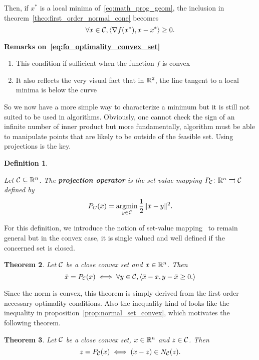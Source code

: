\documentclass[10pt]{article}
\newtheorem{theorem}{Theorem}[]
\newtheorem{definition}[theorem]{Definition}
\numberwithin{equation}{section}
\newcommand{\scal}[2]{\left\langle {#1} , {#2} \right\rangle} %
\begin{document}
	Then, if $x^*$ is a local minima of~\eqref{eq:math_prog_geom}, the inclusion in theorem~\ref{theo:first_order_normal_cone}  becomes
	\begin{equation}\label{eq:fo_optimality_convex_set}
		\forall x \in \calC, \scal{\nabla f(x^*)}{x-x^*} \ge 0.
	\end{equation}
	
	\textbf{Remarks on~\eqref{eq:fo_optimality_convex_set}}
	\begin{enumerate}
		\item This condition if sufficient when the function $f$ is convex
		\item It also reflects the very visual fact that in ${\mathbb{R}}^2$, the line tangent to a local minima is below the curve
	\end{enumerate}
	
	So we now have a more simple way to characterize a minimum but it is still not suited to be used in algorithms. Obviously, one cannot check the sign of an infinite number of inner product but more fundamentally, algorithm must be able to manipulate points that are likely to be outside of the feasible set. Using projections is the key.
	
	\begin{definition}\label{def:projection}
		
		Let ${\mathcal{C}} \subseteq {\mathbb{R}}^n$. The \textbf{projection operator} is the set-value mapping $P_{\mathcal{C}} \colon {\mathbb{R}}^n \rightrightarrows {\mathcal{C}} $ defined by
		\[ P_C(\bar{x}) = \operatorname*{argmin}_{y \in {\mathcal{C}}}  \dfrac{1}{2} \|\bar{x}-y\|^2.\]
	\end{definition}
	
	For this definition, we introduce the notion of set-value mapping~\cite{rockafellarwets:1998} to remain general but in the convex case, it is single valued and well defined if the concerned set is closed. 
	
	\begin{theorem}
		Let ${\mathcal{C}}$ be a close convex set and $x \in {\mathbb{R}}^n$. Then
		\[\bar{x} = P_\calC(x) \iff \forall y \in \calC, \scal{\bar{x}-x}{y-\bar{x} \ge 0.}\]
	\end{theorem}
	
	Since the norm is convex, this theorem is simply derived from the first order necessary optimality  conditions. Also the inequality kind of looks like the inequality in proposition~\eqref{prop:normal_set_convex}, which motivates the following theorem.
	
	\begin{theorem}
		Let ${\mathcal{C}}$ be a close convex set, $x \in {\mathbb{R}}^n$ and $z \in {\mathcal{C}}$. Then
		\[z = P_{\mathcal{C}}(x) \iff (x-z) \in N_{\mathcal{C}}(z).\]
	\end{theorem}
	
\end{document}
